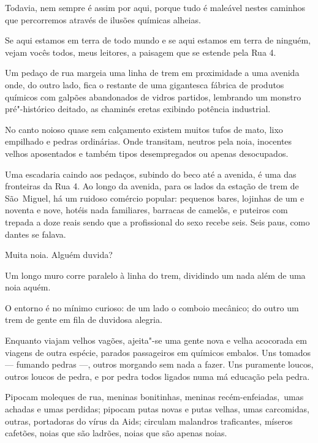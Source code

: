 Todavia, nem sempre é assim por aqui, porque tudo é maleável nestes
caminhos que percorremos através de ilusões químicas alheias.

\asterisc{}

Se aqui estamos em terra de todo mundo e se aqui estamos em terra de
ninguém, vejam vocês todos, meus leitores, a paisagem que se estende
pela Rua 4.

Um pedaço de rua margeia uma linha de trem em proximidade a uma avenida
onde, do outro lado, fica o restante de uma gigantesca fábrica de
produtos químicos com galpões abandonados de vidros partidos, lembrando
um monstro pré"-histórico deitado, as chaminés eretas exibindo potência
industrial.

No canto noioso quase sem calçamento existem muitos tufos de mato, lixo
empilhado e pedras ordinárias. Onde transitam, neutros pela noia,
inocentes velhos aposentados e também tipos desempregados ou apenas
desocupados.

Uma escadaria caindo aos pedaços, subindo do beco até a avenida, é uma
das fronteiras da Rua 4. Ao longo da avenida, para os lados da estação
de trem de São~Miguel, há um ruidoso comércio popular: pequenos bares,
lojinhas de um e noventa e nove, hotéis nada familiares, barracas de
camelôs, e puteiros com trepada a doze reais sendo que a profissional do
sexo recebe seis. Seis paus, como dantes se falava.

Muita noia. Alguém duvida?

\asterisc{}

Um longo muro corre paralelo à linha do trem, dividindo um nada além de
uma noia aquém.

O entorno é no mínimo curioso: de um lado o comboio mecânico; do outro
um trem de gente em fila de duvidosa alegria.

Enquanto viajam velhos vagões, ajeita"-se uma gente nova e velha
acocorada em viagens de outra espécie, parados passageiros em químicos
embalos. Uns tomados --- fumando pedras ---, outros morgando sem nada a
fazer. Uns puramente loucos, outros loucos de pedra, e por pedra todos
ligados numa má educação pela pedra.

\asterisc{}

Pipocam moleques de rua, meninas bonitinhas, meninas recém-enfeiadas,~umas 
achadas e umas perdidas; pipocam putas novas e putas
velhas, umas carcomidas, outras, portadoras do vírus da Aids; circulam
malandros traficantes, míseros cafetões, noias que são ladrões, noias
que são apenas noias.

